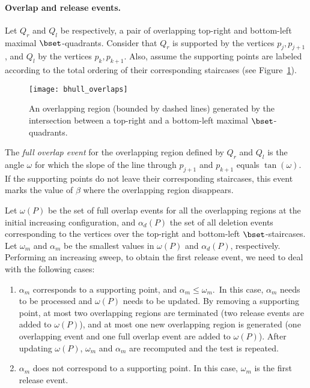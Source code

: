 \documentclass[11pt,letterpaper,english]{article}
\theoremstyle{definition}
\begin{document}
\paragraph{Overlap and release events.}

Let $Q_{r}$ and $Q_{l}$ be respectively, a pair of overlapping
top-right and bottom-left maximal $\bset$-quadrants. Consider that
$Q_r$ is supported by the vertices $p_j,p_{j+1}$, and $Q_l$ by the
vertices $p_k,p_{k+1}$. Also, assume the supporting points are labeled
according to the total ordering of their corresponding staircases
(see Figure~\ref{bhull:fig:eventsw}).

\begin{figure}[ht]
  \centering
  \begin{minipage}{0.9\textwidth}
    \centering
\texttt{[image: bhull\_overlaps]}
    \caption{An overlapping region (bounded by dashed lines) generated
      by the intersection between a top-right and a bottom-left
      maximal $\bset$-quadrants.}
    \label{bhull:fig:eventsw}
  \end{minipage}
\end{figure}

The \emph{full overlap event} for the overlapping region defined by
$Q_{r}$ and $Q_{l}$ is the angle $\omega$ for which the slope of the
line through $p_{j+1}$ and $p_{k+1}$ equals $\tan(\omega)$. If
the supporting points do not leave their corresponding staircases,
this event marks the value of $\beta$ where the overlapping region
disappears.

Let $\omega(P)$ be the set of full overlap events for all the
overlapping regions at the initial increasing configuration, and
$\alpha_d(P)$ the set of all deletion events corresponding to the
vertices over the top-right and bottom-left $\bset$-staircases. Let
$\omega_{m}$ and $\alpha_m$ be the smallest values in $\omega(P)$ and
$\alpha_d(P)$, respectively. Performing an increasing sweep, to obtain
the first release event, we need to deal with the following cases:
\begin{enumerate}
\item \label{bhull:step_1} $\alpha_{m}$ corresponds to a supporting
  point, and $\alpha_{m} \leq \omega_{m}$.\, In this case,
  $\alpha_{m}$ needs to be processed and $\omega(P)$ needs to be
  updated. By removing a supporting point, at most two overlapping
  regions are terminated (two release events are added to
  $\omega(P)$), and at most one new overlapping region is generated
  (one overlapping event and one full overlap event are added to
  $\omega(P)$). After updating $\omega(P)$, $\omega_{m}$ and
  $\alpha_{m}$ are recomputed and the test is repeated.
\item $\alpha_{m}$ does not correspond to a supporting point. In this
  case, $\omega_{m}$ is the first release event.
\end{enumerate}
\end{document}
